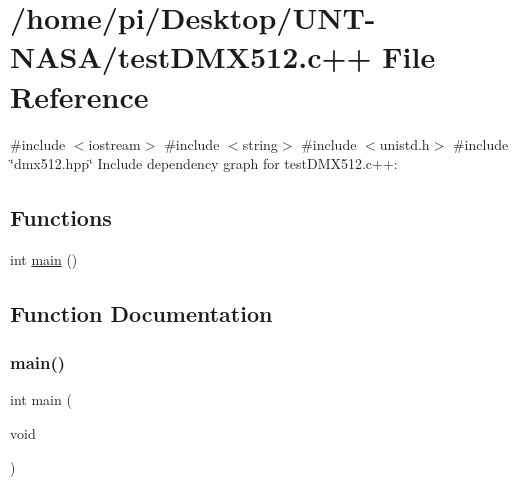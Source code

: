 \hypertarget{testDMX512_8c_09_09}{}\section{/home/pi/\+Desktop/\+U\+N\+T-\/\+N\+A\+S\+A/test\+D\+M\+X512.c++ File Reference}
\label{testDMX512_8c_09_09}
{\ttfamily \#include $<$iostream$>$}\newline
{\ttfamily \#include $<$string$>$}\newline
{\ttfamily \#include $<$unistd.\+h$>$}\newline
{\ttfamily \#include \char`\"{}dmx512.\+hpp\char`\"{}}\newline
Include dependency graph for test\+D\+M\+X512.\+c++\+:
\subsection*{Functions}
\begin{DoxyCompactItemize}
\item 
int \hyperlink{testDMX512_8c_09_09_ae66f6b31b5ad750f1fe042a706a4e3d4}{main} ()
\end{DoxyCompactItemize}


\subsection{Function Documentation}
\mbox{\label{testDMX512_8c_09_09_ae66f6b31b5ad750f1fe042a706a4e3d4}} 
\subsubsection{\texorpdfstring{main()}{main()}}
{\footnotesize\ttfamily int main (\begin{DoxyParamCaption}\item[{void}]{ }\end{DoxyParamCaption})}

